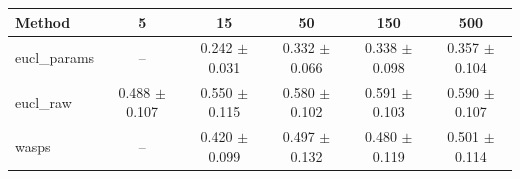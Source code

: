 \begin{table}[htbp]
\centering
\begin{NiceTabular}{lccccc}
\toprule
Method & 5 & 15 & 50 & 150 & 500 \\
\midrule
eucl\_params & -- & 0.242 $\pm$ 0.031 & 0.332 $\pm$ 0.066 & 0.338 $\pm$ 0.098 & 0.357 $\pm$ 0.104 \\
eucl\_raw & 0.488 $\pm$ 0.107 & 0.550 $\pm$ 0.115 & 0.580 $\pm$ 0.102 & 0.591 $\pm$ 0.103 & 0.590 $\pm$ 0.107 \\
wasps & -- & 0.420 $\pm$ 0.099 & 0.497 $\pm$ 0.132 & 0.480 $\pm$ 0.119 & 0.501 $\pm$ 0.114 \\
\bottomrule
\end{NiceTabular}
\label{tab:sens_cpazmal_n_samples_barycenter}
\end{table}
